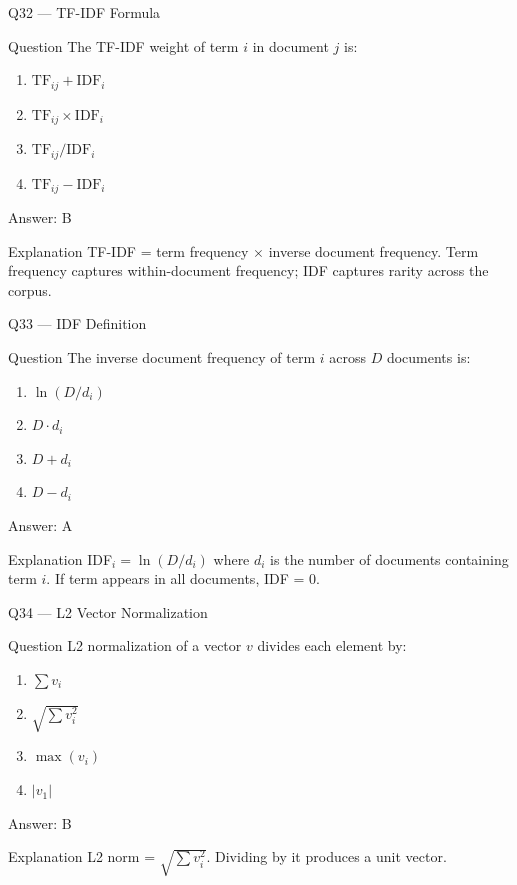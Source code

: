 \documentclass[aspectratio=169,8pt]{beamer}
\begin{document}
	\begin{frame}{Q32 --- TF-IDF Formula}
		\begin{block}{Question}
			The TF-IDF weight of term $i$ in document $j$ is:
			\begin{enumerate}
				\item $\text{TF}_{ij} + \text{IDF}_i$
				\item $\text{TF}_{ij} \times \text{IDF}_i$
				\item $\text{TF}_{ij} / \text{IDF}_i$
				\item $\text{TF}_{ij} - \text{IDF}_i$
			\end{enumerate}
		\end{block}
		\begin{exampleblock}{Answer: B}\end{exampleblock}
		\begin{block}{Explanation}
			TF-IDF = term frequency $\times$ inverse document frequency. Term frequency captures within-document frequency; IDF captures rarity across the corpus.
		\end{block}
	\end{frame}
	
	\begin{frame}{Q33 --- IDF Definition}
		\begin{block}{Question}
			The inverse document frequency of term $i$ across $D$ documents is:
			\begin{enumerate}
				\item $\ln(D / d_i)$
				\item $D \cdot d_i$
				\item $D + d_i$
				\item $D - d_i$
			\end{enumerate}
		\end{block}
		\begin{exampleblock}{Answer: A}\end{exampleblock}
		\begin{block}{Explanation}
			IDF$_i = \ln(D/d_i)$ where $d_i$ is the number of documents containing term $i$. If term appears in all documents, IDF = 0.
		\end{block}
	\end{frame}
	
	\begin{frame}{Q34 --- L2 Vector Normalization}
		\begin{block}{Question}
			L2 normalization of a vector $v$ divides each element by:
			\begin{enumerate}
				\item $\sum v_i$
				\item $\sqrt{\sum v_i^2}$
				\item $\max(v_i)$
				\item $|v_1|$
			\end{enumerate}
		\end{block}
		\begin{exampleblock}{Answer: B}\end{exampleblock}
		\begin{block}{Explanation}
			L2 norm = $\sqrt{\sum v_i^2}$. Dividing by it produces a unit vector.
		\end{block}
	\end{frame}
	
\end{document}
